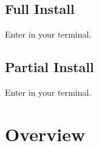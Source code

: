 \documentclass[letterpaper,10pt,english]{sphinxmanual}
\begin{document}
\section{Full Install}
\label{\detokenize{Installation:full-install}}
\sphinxAtStartPar
Enter  in your terminal.


\section{Partial Install}
\label{\detokenize{Installation:partial-install}}
\sphinxAtStartPar
Enter  in your terminal.

\sphinxstepscope


\chapter{Overview}
\end{document}
